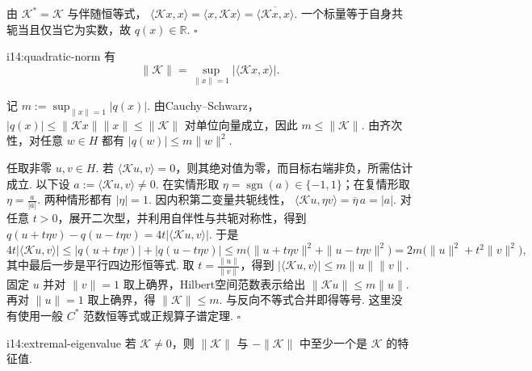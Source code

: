 \begin{FAProof}
由 \(\displaystyle \mathcal K^*=\mathcal K\) 与伴随恒等式，
\(\displaystyle \langle\mathcal Kx,x\rangle = \langle x,\mathcal Kx\rangle = \overline{\langle\mathcal Kx,x\rangle}\).
一个标量等于自身共轭当且仅当它为实数，故 \(\displaystyle q(x)\in\mathbb R\).
\hfill\(\square\)
\end{FAProof}

\begin{FALemma}[B][自伴二次型范数公式]{i14:quadratic-norm}
有
\[
\|\mathcal K\|
=
\sup_{\|x\|=1}
|\langle\mathcal Kx,x\rangle|.
\]
\end{FALemma}

\begin{FAProof}
记 \(\displaystyle m:=\sup_{\|x\|=1}|q(x)|\).
由Cauchy--Schwarz，\(\displaystyle |q(x)|\leqslant\|\mathcal Kx\|\|x\|\leqslant\|\mathcal K\|\) 对单位向量成立，因此 \(\displaystyle m\leqslant\|\mathcal K\|\). 由齐次性，对任意 \(\displaystyle w\in H\) 都有 \(\displaystyle |q(w)|\leqslant m\|w\|^2\).

任取非零 \(\displaystyle u,v\in H\). 若 \(\displaystyle \langle\mathcal Ku,v\rangle=0\)，则其绝对值为零，而目标右端非负，所需估计成立. 以下设 \(\displaystyle a:=\langle\mathcal Ku,v\rangle\neq0\). 在实情形取 \(\displaystyle \eta=\operatorname{sgn}(a)\in\{-1,1\}\)；在复情形取 \(\displaystyle \eta=\frac{a}{|a|}\). 两种情形都有 \(\displaystyle |\eta|=1\). 因内积第二变量共轭线性，
\(\displaystyle \langle\mathcal Ku,\eta v\rangle = \overline\eta\,a = |a|\).
对任意 \(\displaystyle t>0\)，展开二次型，并利用自伴性与共轭对称性，得到
\(\displaystyle q(u+t\eta v)-q(u-t\eta v) = 4t|\langle\mathcal Ku,v\rangle|\).
于是
\[
4t|\langle\mathcal Ku,v\rangle| \leqslant |q(u+t\eta v)|+|q(u-t\eta v)| \leqslant m\bigl(\|u+t\eta v\|^2+\|u-t\eta v\|^2\bigr) = 2m\bigl(\|u\|^2+t^2\|v\|^2\bigr),
\]
其中最后一步是平行四边形恒等式. 取 \(\displaystyle t=\frac{\|u\|}{\|v\|}\)，得到 \(\displaystyle |\langle\mathcal Ku,v\rangle|\leqslant m\|u\|\|v\|\).
固定 \(\displaystyle u\) 并对 \(\displaystyle \|v\|=1\) 取上确界，Hilbert空间范数表示给出 \(\displaystyle \|\mathcal Ku\|\leqslant m\|u\|\). 再对 \(\displaystyle \|u\|=1\) 取上确界，得 \(\displaystyle \|\mathcal K\|\leqslant m\). 与反向不等式合并即得等号. 这里没有使用一般 \(\displaystyle C^*\) 范数恒等式或正规算子谱定理.
\hfill\(\square\)
\end{FAProof}

\begin{FALemma}[B][极值特征值存在]{i14:extremal-eigenvalue}
若 \(\displaystyle \mathcal K\neq0\)，则 \(\displaystyle \|\mathcal K\|\) 与 \(\displaystyle -\|\mathcal K\|\) 中至少一个是 \(\displaystyle \mathcal K\) 的特征值.
\end{FALemma}

